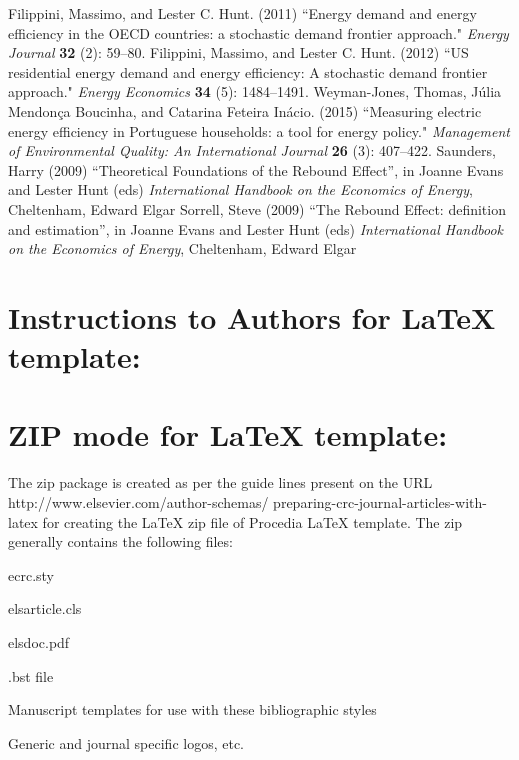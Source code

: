 \documentclass[3p,times,procedia]{elsarticle}
\begin{document}
 \begin{thebibliography}{}


{F}ilippini, Massimo, and Lester C. Hunt. (2011) ``Energy demand and
energy efficiency in the OECD countries: a stochastic demand frontier
approach." {\it Energy Journal} {\bf 32} (2): 59--80.
Filippini, Massimo, and Lester C. Hunt. (2012) ``US residential
energy demand and energy efficiency: A stochastic demand frontier
approach." {\it Energy Economics} {\bf 34} (5): 1484--1491.
Weyman-Jones, Thomas, J\'{u}lia Mendon\c{c}a Boucinha, and Catarina
Feteira In\'{a}cio. (2015) ``Measuring electric energy efficiency in
Portuguese households: a tool for energy policy." {\it Management of Environmental Quality: An International Journal} {\bf 26} (3): 407--422.
\bibitem{} 
Saunders, Harry (2009) ``Theoretical Foundations of the Rebound Effect'', in Joanne Evans and Lester Hunt (eds) {\it International Handbook on the Economics of Energy}, Cheltenham, Edward Elgar
\bibitem{} 
Sorrell, Steve (2009) ``The Rebound Effect: definition and estimation'', in Joanne Evans and Lester Hunt (eds) {\it International Handbook on the Economics of Energy}, Cheltenham, Edward Elgar 
 \end{thebibliography}

\clearpage

\normalMode

\section*{Instructions to Authors for LaTeX template:}

\section{ZIP mode for LaTeX template:}

The zip package is created as per the guide lines present on the URL http://www.elsevier.com/author-schemas/ preparing-crc-journal-articles-with-latex for creating the LaTeX zip file of Procedia LaTeX template.  The zip generally contains the following files:
\begin{Itemize}[]\leftskip-17.7pt
\item ecrc.sty
\item  elsarticle.cls
\item elsdoc.pdf
\item .bst file
\item Manuscript templates for use with these bibliographic styles
\item  Generic and journal specific logos, etc.
\end{Itemize}
\end{document}
